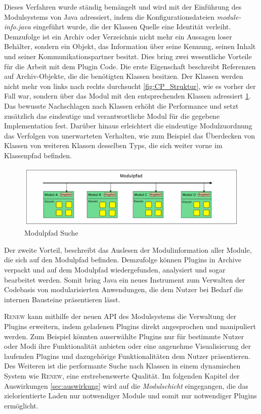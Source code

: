 		Dieses Verfahren wurde ständig bemängelt und wird mit der Einführung des Modulsystems von Java adressiert, indem die Konfigurationsdateien \textit{module-info.java} eingeführt wurde, die der Klassen Quelle eine Identität verleiht. Demzufolge ist ein Archiv oder Verzeichnis nicht mehr ein Aussagen loser Behälter, sondern ein Objekt, das Information über seine Kennung, seinen Inhalt und seiner Kommunikationspartner besitzt.\newline
		Dies bring zwei wesentliche Vorteile für die Arbeit mit dem Plugin Code. Die erste Eigenschaft beschreibt Referenzen auf Archiv-Objekte, die die benötigten Klassen besitzen. Der Klassen werden nicht mehr von links nach rechts durchsucht \ref{fig:CP_Struktur}, wie es vorher der Fall war, sondern über das Modul mit den entsprechenden Klassen adressiert \ref{fig:MP_Struktur}.\cite{kothagal2017modular} \newline
		Das bewusste Nachschlagen nach Klassen erhöht die Performance und setzt zusätzlich das eindeutige und verantwortliche Modul für die gegebene Implementation fest. Darüber hinaus erleichtert die eindeutige Modulzuordnung das Verfolgen von unerwarteten Verhalten, wie zum Beispiel das Überdecken von Klassen von weiteren Klassen desselben Typs, die sich weiter vorne im Klassenpfad befinden.\bigbreak 
		\begin{figure}[h!]
		  \centering
		  \includegraphics[width=\textwidth]{material/images/Modulpfad.pdf}
		  \caption{Modulpfad Suche}
		  \label{fig:MP_Struktur}
		\end{figure}
		Der zweite Vorteil, beschreibt das Auslesen der Modulinformation aller Module, die sich auf den Modulpfad befinden. Demzufolge können Plugins in Archive verpackt und auf dem Modulpfad wiedergefunden, analysiert und sogar bearbeitet werden. Somit bring Java ein neues Instrument zum Verwalten der Codebasis von modularisierten Anwendungen, die dem Nutzer bei Bedarf die internen Bausteine präsentieren lässt.\bigbreak

		\textsc{Renew} kann mithilfe der neuen API des Modulsystems die Verwaltung der Plugins erweitern, indem geladenen Plugins direkt angesprochen und manipuliert werden. Zum Beispiel könnten auserwählte Plugins nur für bestimmte Nutzer oder Modi ihre Funktionalität anbieten oder eine angenehme Visualisierung der laufenden Plugins und dazugehörige Funktionalitäten dem Nutzer präsentieren. Des Weiteren ist die performante Suche nach Klassen in einem dynamischen System wie \textsc{Renew}, eine erstrebenswerte Qualität.  \newline
		Im folgenden Kapitel der Auswirkungen \ref{sec:auswirkung} wird auf die \textit{Modulschicht} eingegangen, die das zielorientierte Laden nur notwendiger Module und somit nur notwendiger Plugins ermöglicht.

